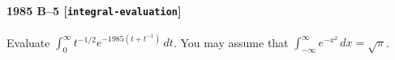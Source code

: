 \paragraph{1985 B--5 \textnormal{[\texttt{integral-evaluation}]}}
Evaluate $\int_0^\infty t^{-1/2}e^{-1985(t+t^{-1})}\,dt$. You may
assume that $\int_{-\infty}^\infty e^{-x^2}\,dx = \sqrt{\pi}$.
